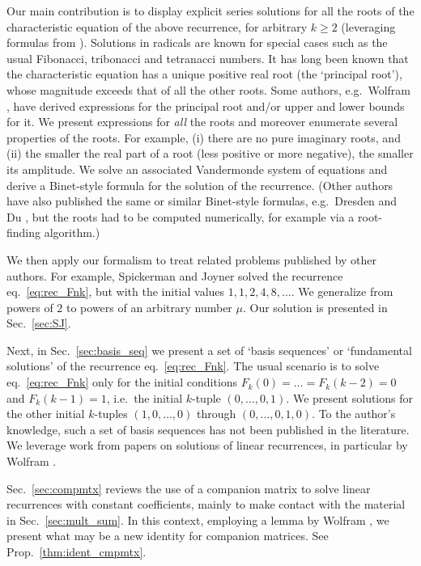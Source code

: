 \documentclass[review]{elsarticle}
\theoremstyle{plain}
\begin{document}
Our main contribution is to display
explicit series solutions for all the roots of the characteristic equation of the above recurrence, for arbitrary $k\ge2$
(leveraging formulas from \cite{DM3}).
Solutions in radicals are known for special cases such as the usual Fibonacci, tribonacci and tetranacci numbers.
It has long been known that the characteristic equation has a unique positive real root (the `principal root'),
whose magnitude exceeds that of all the other roots.
Some authors, e.g.~Wolfram \cite{Wolfram}, have derived expressions for the principal root and/or upper and lower bounds for it.
We present expressions for \emph{all} the roots and moreover enumerate several properties of the roots.
For example,
(i) there are no pure imaginary roots,
and (ii) the smaller the real part of a root (less positive or more negative), the smaller its amplitude.
We solve an associated Vandermonde system of equations and derive a Binet-style formula for the solution of the recurrence.
(Other authors have also published the same or similar Binet-style formulas,
e.g.~Dresden and Du \cite{DresdenDu}, but the roots had to be computed numerically, for example via a root-finding algorithm.)

We then apply our formalism to treat related problems published by other authors.
For example, Spickerman and Joyner \cite{SpickermanJoyner} solved the recurrence eq.~\eqref{eq:rec_Fnk},
but with the initial values $1,1,2,4,8,\dots$.
We generalize from powers of $2$ to powers of an arbitrary number $\mu$.
Our solution is presented in Sec.~\ref{sec:SJ}.

Next, in Sec.~\ref{sec:basis_seq}
we present a set of `basis sequences' or `fundamental solutions' of the recurrence eq.~\eqref{eq:rec_Fnk}.
The usual scenario is to solve eq.~\eqref{eq:rec_Fnk} only for the initial conditions $F_k(0)=\dots=F_k(k-2)=0$ and $F_k(k-1)=1$,
i.e.~the initial $k$-tuple $(0,\dots,0,1)$.
We present solutions for the other initial $k$-tuples $(1,0,\dots,0)$ through $(0,\dots,0,1,0)$.
To the author's knowledge, such a set of basis sequences has not been published in the literature.
We leverage work from papers on solutions of linear recurrences, in particular by Wolfram \cite{Wolfram2000}.

Sec.~\ref{sec:compmtx} reviews the use of a companion matrix to solve linear recurrences with constant coefficients,
mainly to make contact with the material in Sec.~\ref{sec:mult_sum}.
In this context, employing a lemma by Wolfram \cite{Wolfram2000},
we present what may be a new identity for companion matrices.
See Prop.~\ref{thm:ident_cmpmtx}.
\end{document}
